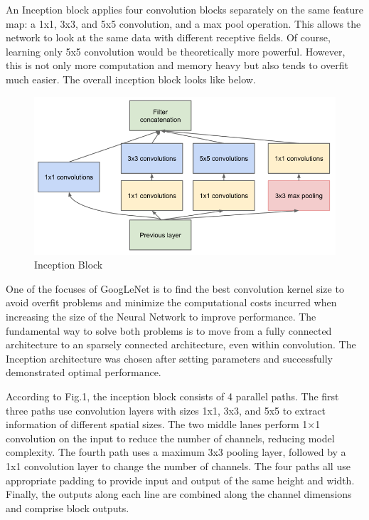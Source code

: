 \documentclass[peerreview]{IEEEtran}
\begin{document}
An Inception block applies four convolution blocks separately on the same feature map: a 1x1, 3x3, and 5x5 convolution, and a max pool operation. This allows the network to look at the same data with different receptive fields. Of course, learning only 5x5 convolution would be theoretically more powerful. However, this is not only more computation and memory heavy but also tends to overfit much easier. The overall inception block looks like below.

\begin{figure}[H]
    \centering
    \includegraphics[width=0.8\columnwidth]{inception_block}
    \caption{Inception Block}
    \label{fig:inception_block}
\end{figure}

One of the focuses of GoogLeNet is to find the best convolution kernel size to avoid overfit problems and minimize the computational costs incurred when increasing the size of the Neural Network to improve performance. The fundamental way to solve both problems is to move from a fully connected architecture to an sparsely connected architecture, even within convolution. The Inception architecture was chosen after setting parameters and successfully demonstrated optimal performance.

According to Fig.1, the inception block consists of 4 parallel paths. The first three paths use convolution layers with sizes 1x1, 3x3, and 5x5 to extract information of different spatial sizes. The two middle lanes perform 1×1 convolution on the input to reduce the number of channels, reducing model complexity. The fourth path uses a maximum 3x3 pooling layer, followed by a 1x1 convolution layer to change the number of channels. The four paths all use appropriate padding to provide input and output of the same height and width. Finally, the outputs along each line are combined along the channel dimensions and comprise block outputs.
\end{document}
